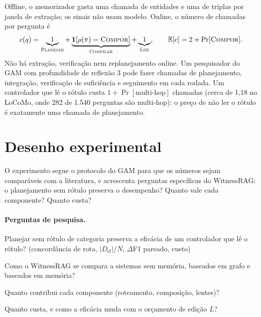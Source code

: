 \documentclass[11pt]{article}
\newcommand{\Compose}{\textsc{Compor}}
\begin{document}
Offline, o memorizador gasta uma chamada de entidades e uma de triplas por
janela de extração; os sinais não usam modelo. Online, o número de chamadas
por pergunta é
\begin{equation}
  c(q)=\underbrace{1}_{\textsc{Planejar}}+\underbrace{\mathbf{1}[\rho(\pi)=\Compose]}_{\textsc{Compilar}}
  +\underbrace{1}_{\textsc{Ler}},
  \qquad \mathbb{E}[c]=2+\Pr[\Compose].
  \label{eq:custo}
\end{equation}
Não há extração, verificação nem replanejamento online. Um pesquisador do
GAM com profundidade de reflexão 3 pode fazer chamadas de planejamento,
integração, verificação de suficiência e seguimento em cada rodada. Um
controlador que lê o rótulo custa $1+\Pr[\text{multi-hop}]$ chamadas (cerca
de 1,18 no LoCoMo, onde 282 de 1.540 perguntas são multi-hop): o preço de não
ler o rótulo é exatamente uma chamada de planejamento.

\section{Desenho experimental}\label{sec:experimentos}

\begin{intuicao}
O experimento segue o protocolo do GAM para que os números sejam comparáveis
com a literatura, e acrescenta perguntas específicas do WitnessRAG: o
planejamento sem rótulo preserva o desempenho? Quanto vale cada componente?
Quanto custa?
\end{intuicao}

\paragraph{Perguntas de pesquisa.}
\begin{description}[nosep, leftmargin=1em]
\item[QP1] Planejar sem rótulo de categoria preserva a eficácia de um
controlador que lê o rótulo? (concordância de rota, $|D_{\text{ef}}|/N$,
$\Delta$F1 pareado, custo)
\item[QP2] Como o WitnessRAG se compara a sistemas sem memória, baseados em
grafo e baseados em memória?
\item[QP3] Quanto contribui cada componente (roteamento, composição, lentes)?
\item[QP4] Quanto custa, e como a eficácia muda com o orçamento de edição $L$?
\end{description}
\end{document}
